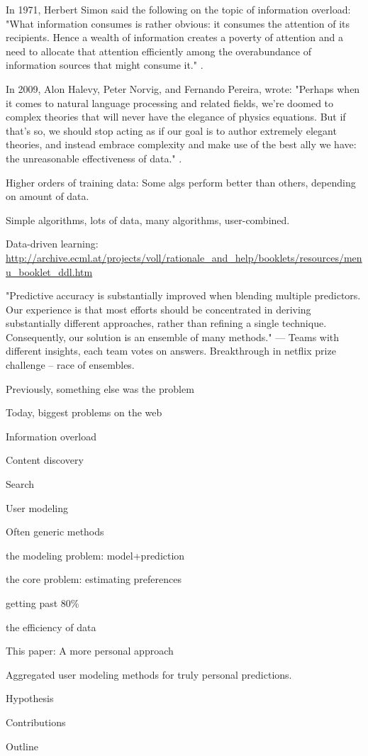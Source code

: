 In 1971, Herbert Simon said the following on the topic of information overload: 
"What information consumes is rather obvious: it consumes the attention of its recipients. 
Hence a wealth of information creates a poverty of attention and 
a need to allocate that attention efficiently among the overabundance of 
information sources that might consume it." \cite{Greenberger1971}.


In 2009, Alon Halevy, Peter Norvig, and Fernando Pereira, wrote:
"Perhaps when it comes to natural language processing and related fields, 
we’re doomed to complex theories that will never have the elegance of physics equations. 
But if that’s so, we should stop acting as if our goal is to author extremely elegant theories, 
and instead embrace complexity and make use of the best ally we have: 
the unreasonable effectiveness of data."
\cite{Halevy2009}.

Higher orders of training data:
Some algs perform better than others, depending on amount of data.
\cite{Banko2001}

Simple algorithms, lots of data, many algorithms, user-combined.

Data-driven learning:
\url{http://archive.ecml.at/projects/voll/rationale_and_help/booklets/resources/menu_booklet_ddl.htm}

"Predictive accuracy is substantially improved when blending multiple predictors. 
Our experience is that most efforts should be concentrated in deriving substantially 
different approaches, rather than refining a single technique. 
Consequently, our solution is an ensemble of many methods."
--- \cite{Bell2007}
Teams with different insights, each team votes on answers.
Breakthrough in netflix prize challenge -- race of ensembles.


Previously, something else was the problem

Today, biggest problems on the web

Information overload

Content discovery

Search

User modeling

Often generic methods

the modeling problem: model+prediction

the core problem: estimating preferences

getting past 80\%

the efficiency of data

This paper: A more personal approach

Aggregated user modeling methods for 
truly personal predictions.

Hypothesis

Contributions

Outline


